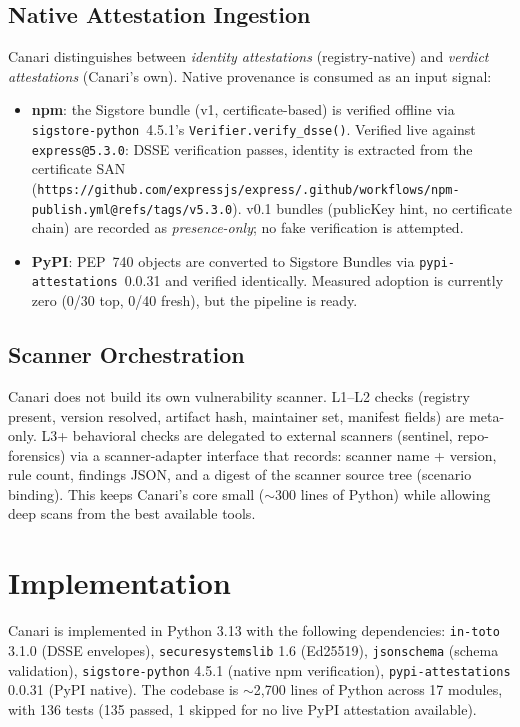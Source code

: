 \documentclass[11pt,a4paper]{article}
\begin{document}
\subsection{Native Attestation Ingestion}

Canari distinguishes between \emph{identity attestations} (registry-native) and
\emph{verdict attestations} (Canari's own). Native provenance is consumed as an
input signal:

\begin{itemize}[leftmargin=1.5em]
\item \textbf{npm}: the Sigstore bundle (v1, certificate-based) is verified
offline via \texttt{sigstore-python}~4.5.1's \texttt{Verifier.verify\_dsse()}.
Verified live against \texttt{express@5.3.0}: DSSE verification passes,
identity is extracted from the certificate SAN
(\texttt{https://github.com/expressjs/express/.github/workflows/npm-publish.yml@refs/tags/v5.3.0}).
v0.1 bundles (publicKey hint, no certificate chain) are recorded as
\emph{presence-only}; no fake verification is attempted.
\item \textbf{PyPI}: PEP~740 objects are converted to Sigstore Bundles via
\texttt{pypi-attestations}~0.0.31 and verified identically. Measured adoption
is currently zero (0/30 top, 0/40 fresh), but the pipeline is ready.
\end{itemize}

\subsection{Scanner Orchestration}

Canari does not build its own vulnerability scanner. L1--L2 checks (registry
present, version resolved, artifact hash, maintainer set, manifest fields) are
meta-only. L3+ behavioral checks are delegated to external scanners (sentinel,
repo-forensics) via a scanner-adapter interface that records:
scanner name + version, rule count, findings JSON, and a digest of the scanner
source tree (scenario binding). This keeps Canari's core small ($\sim$300 lines
of Python) while allowing deep scans from the best available tools.

\section{Implementation}

Canari is implemented in Python 3.13 with the following dependencies:
\texttt{in-toto} 3.1.0 (DSSE envelopes), \texttt{securesystemslib} 1.6
(Ed25519), \texttt{jsonschema} (schema validation), \texttt{sigstore-python} 4.5.1
(native npm verification), \texttt{pypi-attestations} 0.0.31 (PyPI native).
The codebase is $\sim$2{,}700 lines of Python across 17 modules, with 136 tests
(135 passed, 1 skipped for no live PyPI attestation available).
\end{document}
